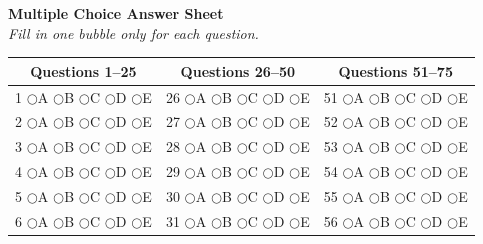 \documentclass[12pt]{article}
\begin{document}
\begin{titlepage}
{\begin{minipage}{0.96\textwidth}
\vspace{0.2cm}
\end{minipage}
}

\vspace{0.8cm}
\newpage
\begin{center}
{\large \textbf{Multiple Choice Answer Sheet}}\\[0.2cm]
\textit{Fill in one bubble only for each question.}
\end{center}

\vspace{0.3cm}

\begin{center}
\renewcommand{\arraystretch}{1.25}
\begin{tabular}{ccc}
\toprule
\textbf{Questions 1--25} & \textbf{Questions 26--50} & \textbf{Questions 51--75} \\
\midrule

1 \quad $\bigcirc$A $\bigcirc$B $\bigcirc$C $\bigcirc$D $\bigcirc$E &
26 \quad $\bigcirc$A $\bigcirc$B $\bigcirc$C $\bigcirc$D $\bigcirc$E &
51 \quad $\bigcirc$A $\bigcirc$B $\bigcirc$C $\bigcirc$D $\bigcirc$E \\

2 \quad $\bigcirc$A $\bigcirc$B $\bigcirc$C $\bigcirc$D $\bigcirc$E &
27 \quad $\bigcirc$A $\bigcirc$B $\bigcirc$C $\bigcirc$D $\bigcirc$E &
52 \quad $\bigcirc$A $\bigcirc$B $\bigcirc$C $\bigcirc$D $\bigcirc$E \\

3 \quad $\bigcirc$A $\bigcirc$B $\bigcirc$C $\bigcirc$D $\bigcirc$E &
28 \quad $\bigcirc$A $\bigcirc$B $\bigcirc$C $\bigcirc$D $\bigcirc$E &
53 \quad $\bigcirc$A $\bigcirc$B $\bigcirc$C $\bigcirc$D $\bigcirc$E \\

4 \quad $\bigcirc$A $\bigcirc$B $\bigcirc$C $\bigcirc$D $\bigcirc$E &
29 \quad $\bigcirc$A $\bigcirc$B $\bigcirc$C $\bigcirc$D $\bigcirc$E &
54 \quad $\bigcirc$A $\bigcirc$B $\bigcirc$C $\bigcirc$D $\bigcirc$E \\

5 \quad $\bigcirc$A $\bigcirc$B $\bigcirc$C $\bigcirc$D $\bigcirc$E &
30 \quad $\bigcirc$A $\bigcirc$B $\bigcirc$C $\bigcirc$D $\bigcirc$E &
55 \quad $\bigcirc$A $\bigcirc$B $\bigcirc$C $\bigcirc$D $\bigcirc$E \\

6 \quad $\bigcirc$A $\bigcirc$B $\bigcirc$C $\bigcirc$D $\bigcirc$E &
31 \quad $\bigcirc$A $\bigcirc$B $\bigcirc$C $\bigcirc$D $\bigcirc$E &
56 \quad $\bigcirc$A $\bigcirc$B $\bigcirc$C $\bigcirc$D $\bigcirc$E \\


\end{tabular}
\end{center}
\end{titlepage}
\end{document}
